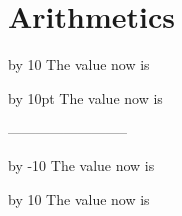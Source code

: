 \documentclass{article}
\begin{document}
 \section{Arithmetics}

 \newcount\tempa
 \advance\tempa by 10
 The value now is \the\tempa
 
 \newdimen\variable
 \variable=12pt
 \advance\variable by 10pt
 The value now is \the\variable
 
 --------------------------
 
 \multiply\tempa by -10
 The value now is \the\tempa
 
 \multiply\variable by 10
 The value now is \the\variable
\end{document}
